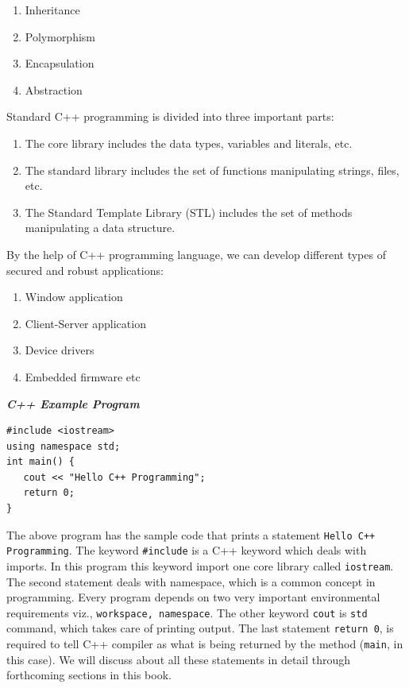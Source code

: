 \documentclass{book}
\begin{document}
\begin{enumerate}
	\item Inheritance
\item Polymorphism
\item Encapsulation
\item Abstraction
\end{enumerate}

Standard C++ programming is divided into three important parts:

\begin{enumerate}
	\item The core library includes the data types, variables and literals, etc.
\item The standard library includes the set of functions manipulating strings, files, etc.
\item The Standard Template Library (STL) includes the set of methods manipulating a data structure.
\end{enumerate}

By the help of C++ programming language, we can develop different types of secured and robust applications:

\begin{enumerate}
	\item Window application
\item Client-Server application
\item Device drivers
\item Embedded firmware etc
\end{enumerate}

\textbf{\textit{C++ Example Program}}

\begin{verbatim}
#include <iostream>  
using namespace std;  
int main() {  
   cout << "Hello C++ Programming";  
   return 0;  
}  
\end{verbatim}

The above program has the sample code that prints a statement \texttt{Hello C++ Programming}. The keyword \texttt{#include} is a C++ keyword which deals with imports. In this program this keyword import one core library called \texttt{iostream}. The second statement deals with namespace, which is a common concept in programming. Every program depends on two very important environmental requirements viz., \texttt{workspace, namespace}. The other keyword \texttt{cout} is \texttt{std} command, which takes care of printing output. The last statement \texttt{return 0}, is required to tell C++ compiler as what is being returned by the method (\texttt{main}, in this case). We will discuss about all these statements in detail through forthcoming sections in this book. 
\end{document}
